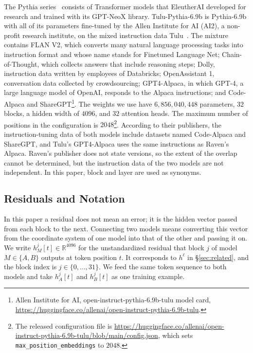 \documentclass[conference]{IEEEtran}
\begin{document}
The Pythia series~\cite{3618408.3618510} consists of Transformer models that EleutherAI developed for research and trained with its
GPT-NeoX library. Tulu-Pythia-6.9b is Pythia-6.9b with all of its parameters fine-tuned by the Allen Institute for AI (AI2), a non-profit
research institute, on the mixed instruction data Tulu~\cite{3666122.3669390}. The mixture contains FLAN V2, which converts many
natural language processing tasks into instruction format and whose name stands for Finetuned Language Net; Chain-of-Thought, which
collects answers that include reasoning steps; Dolly, instruction data written by employees of Databricks; OpenAssistant 1,
conversation data collected by crowdsourcing; GPT4-Alpaca, in which GPT-4, a large language model of OpenAI, responds to the Alpaca
instructions; and Code-Alpaca and ShareGPT\footnote{Allen Institute for AI,
open-instruct-pythia-6.9b-tulu model card,
\url{https://huggingface.co/allenai/open-instruct-pythia-6.9b-tulu}.}.
The weights we use have $6{,}856{,}040{,}448$ parameters, $32$ blocks, a hidden width of $4096$,
and $32$ attention heads. The maximum number of positions in the configuration is $2048$\footnote{The released configuration file is
\url{https://huggingface.co/allenai/open-instruct-pythia-6.9b-tulu/blob/main/config.json}, which sets
\texttt{max\_position\_embeddings} to $2048$.}.
According to their publishers, the instruction-tuning data of both models include datasets named Code-Alpaca and ShareGPT, and
Tulu's GPT4-Alpaca uses the same instructions as Raven's Alpaca. Raven's publisher does not state versions, so the extent of the
overlap cannot be determined, but the instruction data of the two models are not independent.
In this paper, block and layer are used as synonyms.

\subsection{Residuals and Notation}\label{sec:notation}
In this paper a residual does not mean an error; it is the hidden vector passed from each block to the next. Connecting two models
means converting this vector from the coordinate system of one model into that of the other and passing it on.
We write $h_M^j[t]\in\mathbb R^{4096}$ for the unstandardized residual that block $j$ of model $M\in\{A,B\}$ outputs at token position $t$.
It corresponds to $h^{\ell}$ in \S\ref{sec:related}, and the block index is $j\in\{0,\ldots,31\}$.
We feed the same token sequence to both models and take $h_A^j[t]$ and $h_B^j[t]$ as one training example.
\end{document}
